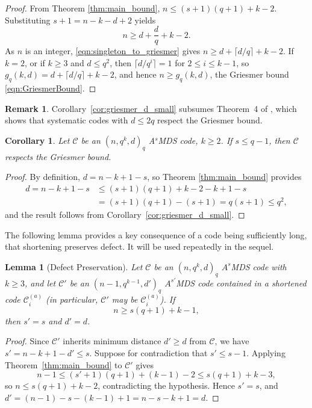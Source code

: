 \documentclass[12pt, letterpaper]{article}
\theoremstyle{plain}
\newtheorem{lemma}[theorem]{Lemma}
\newtheorem{corollary}[theorem]{Corollary}
\theoremstyle{definition}
\newtheorem{remark}[theorem]{Remark}
\begin{document}
	\begin{proof}
		From Theorem \ref{thm:main_bound}, $n\le (s+1)(q+1)+k-2$. Substituting $s+1=n-k-d+2$ yields 
		\begin{equation}\label{eqn:singleton_to_griesmer}
			n\ge d+\frac{d}{q} +k-2.
		\end{equation}
		As $n$ is an integer, \eqref{eqn:singleton_to_griesmer} gives $n\ge d+\lceil d/q\rceil+k-2$. If $k=2$, or if $k\ge 3$ and $d\le q^2$, then $\lceil d/q^i\rceil = 1$ for $2\le i\le k-1$, so $g_q(k,d)= d+\lceil d/q\rceil +k-2$, and hence $n\ge g_q(k,d)$, the Griesmer bound \eqref{eqn:GriesmerBound}.
	\end{proof}
	
	\begin{remark}
		Corollary~\ref{cor:griesmer_d_small} subsumes Theorem~4 of \cite{Guerrini2015Optimal}, which shows that systematic codes with $d\le 2q$ respect the Griesmer bound.
	\end{remark}
	
	\begin{corollary} \label{cor:griesmer_s_small}
		Let $\mathcal{C}$ be an $(n,q^k,d)_q$ A$^s$MDS code, $k\ge 2$. If $s\le  q-1$, then $\mathcal{C}$ respects the Griesmer bound.
	\end{corollary}
	\begin{proof}
		By definition, $d=n-k+1-s$, so Theorem  \ref{thm:main_bound} provides   \begin{align*}
			d=n-k+1-s & \le (s+1)(q+1)+k-2-k+1-s\\ &= (s+1)(q+1) - (s+1) = q(s+1)\le q^2,
		\end{align*}  
		and the result follows from Corollary~\ref{cor:griesmer_d_small}.
	\end{proof}

	The following lemma provides a key consequence of a code being sufficiently long, that shortening preserves defect. It will be used repeatedly in the sequel.
	
	\begin{lemma}[Defect Preservation]\label{lem:defect_preserved}
		Let $\mathcal{C}$ be an $(n, q^k, d)_q$ $A^s$MDS code with $k \ge 3$, and let $\mathcal{C}'$ be an $(n-1, q^{k-1}, d')_q$ $A^{s'}$MDS code contained in a shortened code $\mathcal{C}_i^{(a)}$ (in particular, $\mathcal{C}'$ may be $\mathcal{C}_i^{(a)}$). If \[
		n \ge s(q+1) + k - 1,
		\]
		then $s' = s$ and $d' = d$.
	\end{lemma}

	\begin{proof}
		Since $\mathcal{C}'$ inherits minimum distance $d' \ge d$ from $\mathcal{C}$, we have $s' = n - k + 1 - d' \le s$. Suppose for contradiction that $s' \le s-1$. Applying Theorem~\ref{thm:main_bound} to $\mathcal{C}'$ gives
		\[
		n - 1 \le (s'+1)(q+1) + (k-1) - 2 \le s(q+1) + k - 3,
		\]
		so $n \le s(q+1)+k-2$, contradicting the hypothesis. Hence $s'=s$, and $d' = (n-1)-s-(k-1)+1 = n-s-k+1 = d$.
	\end{proof}
	
\end{document}
